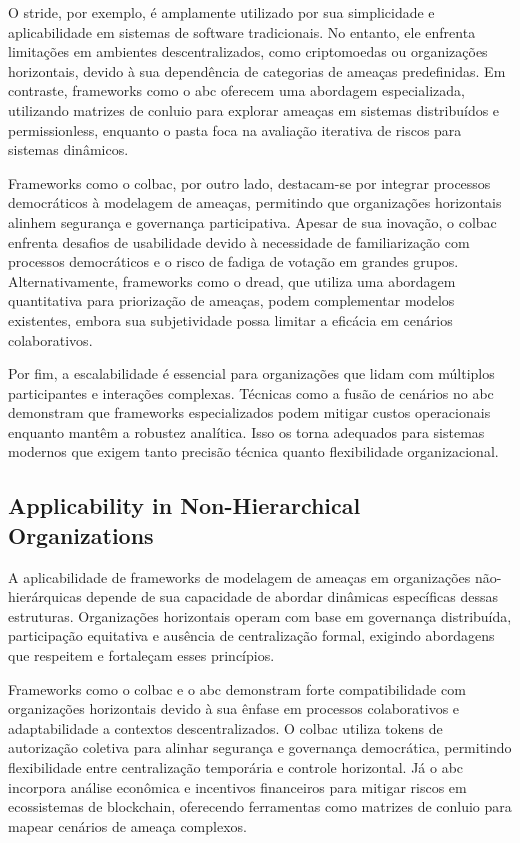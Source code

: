 O \gls{stride}, por exemplo, é amplamente utilizado por sua simplicidade e
aplicabilidade em sistemas de software tradicionais. No entanto, ele
enfrenta limitações em ambientes descentralizados, como criptomoedas
ou organizações horizontais, devido à sua dependência de categorias de
ameaças predefinidas. Em contraste, frameworks como
o \gls{abc} oferecem uma abordagem especializada,
utilizando matrizes de conluio para explorar ameaças em
sistemas distribuídos e permissionless, enquanto o \gls{pasta} foca na
avaliação iterativa de riscos para sistemas dinâmicos.

Frameworks como o \gls{colbac}, por outro lado, destacam-se por integrar
processos democráticos à modelagem de ameaças, permitindo que
organizações horizontais alinhem segurança e governança participativa.
Apesar de sua inovação, o \gls{colbac} enfrenta desafios de usabilidade
devido à necessidade de familiarização com processos democráticos e o
risco de fadiga de votação em grandes grupos. Alternativamente,
frameworks como o \gls{dread}, que utiliza uma abordagem quantitativa para
priorização de ameaças, podem complementar modelos existentes, embora
sua subjetividade possa limitar a eficácia em cenários colaborativos.

Por fim, a escalabilidade é essencial para organizações que lidam com
múltiplos participantes e interações complexas. Técnicas como a fusão
de cenários no \gls{abc} demonstram que frameworks especializados
podem mitigar custos operacionais enquanto mantêm a robustez
analítica. Isso os torna adequados para sistemas modernos que exigem
tanto precisão técnica quanto flexibilidade organizacional.

\subsection{Applicability in Non-Hierarchical Organizations}
\label{subsec:applicability_non_hierarchical}

A aplicabilidade de frameworks de modelagem de ameaças em organizações
não-hierárquicas depende de sua capacidade de abordar dinâmicas
específicas dessas estruturas. Organizações horizontais operam com
base em governança distribuída, participação equitativa e ausência de 
centralização formal, exigindo abordagens que respeitem e fortaleçam
esses princípios.

Frameworks como o \gls{colbac} e o \gls{abc} demonstram forte
compatibilidade com organizações horizontais devido à sua ênfase em
processos colaborativos e adaptabilidade a contextos descentralizados.
O  \gls{colbac} utiliza tokens de autorização coletiva para alinhar segurança
e governança democrática, permitindo flexibilidade entre centralização
temporária e controle horizontal. Já o \gls{abc} incorpora análise
econômica e incentivos financeiros para mitigar riscos em ecossistemas
de blockchain, oferecendo ferramentas como matrizes de conluio para
mapear cenários de ameaça complexos.

